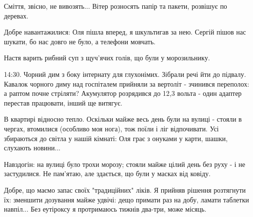Сміття, звісно, не вивозять... Вітер розносять папір та пакети,   розвішує по
деревах.

Добре навантажилися: Оля пішла вперед, я шкультигав за нею. Сергій пішов нас
шукати, бо нас довго не було, а телефони мовчать. 

Настя варить рибний суп з щуч'ячих голів, що були у морозильнику.

14:30. Чорний дим з боку інтернату для глухонімих. Зібрали речі йти до підвалу.
Кавалок чорного диму над госпіталем прийняли за вертоліт - зчинився переполох:
а раптом почне стріляти? Акумулятор розрядився до 12,3 вольта - один адаптер
перестав працювати, інший ще витягує.

В квартирі відносно тепло. Оскільки майже весь день були на вулиці - стояли в
чергах, втомилися (особливо моя нога), тож поїли і ліг відпочивати. Усі
збираються до світла у нашій кімнаті: Оля грає з онуками у карти, шашки,
слухають новини...

Навздогін: на вулиці було трохи морозу; стояли майже цілий день без руху - і не
застудилися. Не пам'ятаю, але здається, що були у масках від ковіду. 

Добре, що маємо запас своїх "традиційних" ліків. Я прийняв рішення розтягнути
їх: зменшити дозування майже удвічі: дещо примати раз на добу, ламати таблетки
навпіл... Без еутіроксу я протримаюсь тижнів два-три, може місяць.


